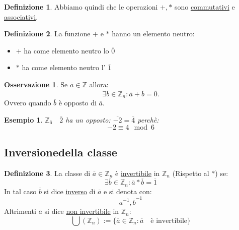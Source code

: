 \documentclass{article}
\newtheorem{exmp}{Esempio}[section]
\theoremstyle{definition}
\newtheorem{definition}{Definizione}[section]
\newtheorem{oss}{Osservazione}[section]
\begin{document}
\begin{definition}
        Abbiamo quindi che le operazioni $+ , *$ sono \underline{commutativi} e \underline{associativi}. 
\end{definition}


\begin{definition}
        La funzione $+$ e $ * $ hanno un elemento neutro:
        \begin{itemize}
                \item $+$ ha come elemento neutro lo $\overline{0}$ 
                \item $*$ ha come elemento neutro l' $\overline{1}$ 
        \end{itemize}
\end{definition}

\begin{oss}
        Se $\overline{a} \in \mathbb{Z}$ allora:
        \begin{equation*}
                \exists \overline{b} \in \mathbb{Z}_n : \overline{a} + \overline{b} = \overline{0}.
        \end{equation*}
        Ovvero quando $ \overline{b}$ è opposto di $\overline{a}$.
\end{oss}

\begin{exmp}
        $ \mathbb{Z}_6 \quad \overline{2}$ ha un opposto: $\overline{-2} = \overline{4}$ perchè:
        \begin{equation*}
                -2 \equiv 4 \mod 6
        \end{equation*}
\end{exmp}



\subsection{Inversionedella classe}
\begin{definition}
        La classe di $\overline{a} \in \mathbb{Z}_n$ è \underline{invertibile} in $ \mathbb{Z}_n $ (Rispetto al $*$) se:
        \begin{equation*}
                \exists \overline{b} \in \mathbb{Z}_n : \overline{a} * \overline{b} = \overline{1}
        \end{equation*}
        In tal caso $\overline{b}$ si dice \underline{inverso} di $\overline{a}$ e si denota con:
        \begin{equation*}
                \overline{a}^{-1}, \overline{b}^{-1}
        \end{equation*}
        Altrimenti $\overline{a}$ si dice \underline{non invertibile} in $\mathbb{Z}_n$:
        \begin{equation*}
                \bigcup(\mathbb{Z}_n) := \{\overline{a} \in \mathbb{Z}_n : \overline{a} \quad \mbox{è invertibile}\} 
        \end{equation*}
\end{definition}
\end{document}
